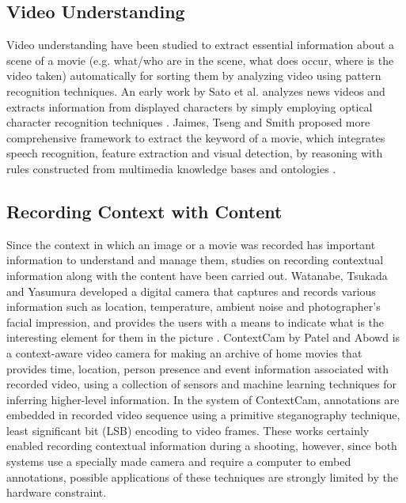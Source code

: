 \subsection{Video Understanding}

Video understanding have been studied to extract essential information about a scene of a movie (e.g. what/who are in the scene, what does occur, where is the video taken) automatically for sorting them by analyzing video using pattern recognition techniques.
An early work by Sato et al. analyzes news videos and extracts information from displayed characters by simply employing optical character recognition techniques \cite{sato1998video}.
Jaimes, Tseng and Smith proposed more comprehensive framework to extract the keyword of a movie, which integrates speech recognition, feature extraction and visual detection, by reasoning with rules constructed from multimedia knowledge bases and ontologies \cite{jaimes2003modal}.

\subsection{Recording Context with Content}
Since the context in which an image or a movie was recorded has important information to understand and manage them, studies on recording contextual information along with the content have been carried out.
Watanabe, Tsukada and Yasumura developed a digital camera that captures and records various information such as location, temperature, ambient noise and photographer's facial impression, and provides the users with a means to indicate what is the interesting element for them in the picture \cite{Watanabe:2007:WDC:1240866.1241073}.
ContextCam by Patel and Abowd \cite{Patel04thecontextcam:} is a context-aware video camera for making an archive of home movies that provides time, location, person presence and event information associated with recorded video, using a collection of sensors and machine learning techniques for inferring higher-level information.
In the system of ContextCam, annotations are embedded in recorded video sequence using a primitive steganography technique, least significant bit (LSB) encoding to video frames.
These works certainly enabled recording contextual information during a shooting, however, since both systems use a specially made camera and require a computer to embed annotations, possible applications of these techniques are strongly limited by the hardware constraint.

